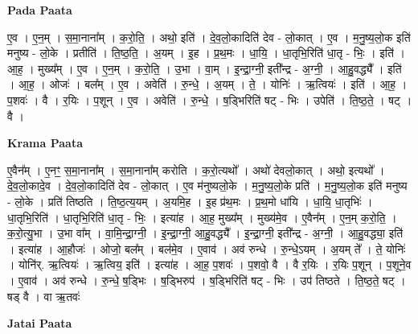 \documentclass[17pt]{extarticle}
\begin{document}
\textbf{Pada Paata} \newline

ए॒व । ए॒न॒म् । स॒मा॒नाना᳚म् । क॒रो॒ति॒ । अथो॒ इति॑ । दे॒व॒लो॒कादिति॑ देव - लो॒कात् । ए॒व । म॒नु॒ष्य॒लो॒क इति॑ मनुष्य - लो॒के । प्रतीति॑ । ति॒ष्ठ॒ति॒ । अ॒यम् । इ॒ह । प्र॒थ॒मः । धा॒यि॒ । धा॒तृभि॒रिति॑ धा॒तृ - भिः॒ । इति॑ । आ॒ह॒ । मुख्य᳚म् । ए॒व । ए॒न॒म् । क॒रो॒ति॒ । उ॒भा । वा॒म् । इ॒न्द्रा॒ग्नी॒ इती᳚न्द्र - अ॒ग्नी॒ । आ॒हु॒वद्ध्यै᳚ । इति॑ । आ॒ह॒ । ओजः॑ । बल᳚म् । ए॒व । अवेति॑ । रु॒न्धे॒ । अ॒यम् । ते॒ । योनिः॑ । ऋ॒त्वियः॑ । इति॑ । आ॒ह॒ । प॒शवः॑ । वै । र॒यिः । प॒शून् । ए॒व । अवेति॑ । रु॒न्धे॒ । ष॒ड्भिरिति॑ षट् - भिः । उपेति॑ । ति॒ष्ठ॒ते॒ । षट् । वै ।  \newline


\textbf{Krama Paata} \newline

ए॒वैन᳚म् । ए॒नꣳ॒॒ स॒मा॒नाना᳚म् । स॒मा॒नाना᳚म् करोति । क॒रो॒त्यथो᳚ । अथो॑ देवलो॒कात् । अथो॒ इत्यथो᳚ । दे॒व॒लो॒कादे॒व । दे॒व॒लो॒कादिति॑ देव - लो॒कात् । ए॒व म॑नुष्यलो॒के । म॒नु॒ष्य॒लो॒के प्रति॑ । म॒नु॒ष्य॒लो॒क इति॑ मनुष्य - लो॒के । प्रति॑ तिष्ठति । ति॒ष्ठ॒त्य॒यम् । अ॒यमि॒ह । इ॒ह प्र॑थ॒मः । प्र॒थ॒मो धा॑यि । धा॒यि॒ धा॒तृभिः॑ । धा॒तृभि॒रिति॑ । धा॒तृभि॒रिति॑ धा॒तृ - भिः॒ । इत्या॑ह । आ॒ह॒ मुख्य᳚म् । मुख्य॑मे॒व । ए॒वैन᳚म् । ए॒न॒म् क॒रो॒ति॒ । क॒रो॒त्यु॒भा । उ॒भा वा᳚म् । वा॒मि॒न्द्रा॒ग्नी॒ । इ॒न्द्रा॒ग्नी॒ आ॒हु॒वद्ध्यै᳚ । इ॒न्द्रा॒ग्नी॒ इती᳚न्द्र - अ॒ग्नी॒ । आ॒हु॒वद्ध्या॒ इति॑ । इत्या॑ह । आ॒हौजः॑ । ओजो॒ बल᳚म् । बल॑मे॒व । ए॒वाव॑ । अव॑ रुन्धे । रु॒न्धे॒ऽयम् । अ॒यम् ते᳚ । ते॒ योनिः॑ । योनि॑र्. ऋ॒त्वियः॑ । ऋ॒त्विय॒ इति॑ । इत्या॑ह । आ॒ह॒ प॒शवः॑ । प॒शवो॒ वै । वै र॒यिः । र॒यिः प॒शून् । प॒शूने॒व । ए॒वाव॑ । अव॑ रुन्धे । रु॒न्धे॒ ष॒ड्भिः । ष॒ड्भिरुप॑ । ष॒ड्भिरिति॑ षट् - भिः । उप॑ तिष्ठते । ति॒ष्ठ॒ते॒ षट् । षड् वै । वा ऋ॒तवः॑ \newline

\textbf{Jatai Paata} \newline
\end{document}
